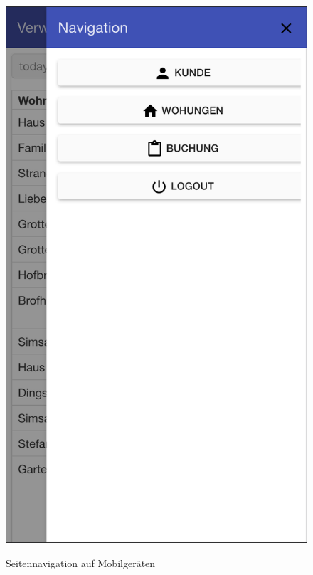 \begin{figure}[H]
\begin{minipage}[t]{0.49\linewidth}
        \centering
        \includegraphics[width=\linewidth]{images/frontend_header_small_navigation.png}
        \label{frontend_header_small_navigation}
        \caption{Seitennavigation auf Mobilgeräten}
    \end{minipage}
\end{figure}


